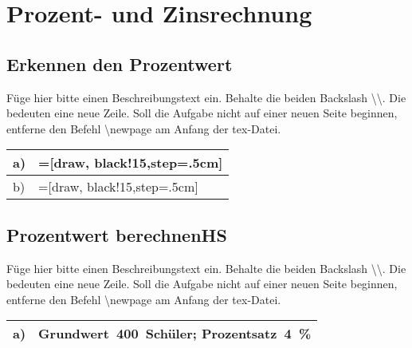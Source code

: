 \newpage
\section{Prozent- und Zinsrechnung}
\subsection{Erkennen den Prozentwert}
Füge hier bitte einen Beschreibungstext ein. Behalte die beiden Backslash \textbackslash\textbackslash. Die bedeuten eine neue Zeile. Soll die Aufgabe nicht auf einer neuen Seite beginnen, entferne den Befehl \textbackslash newpage am Anfang der tex-Datei.\\
\begin{xltabular}{\textwidth}{|C{0.75cm}|X|}
\hline
a)&=[draw, black!15,step=.5cm]
\\\hline
b)&=[draw, black!15,step=.5cm]
\\\hline
\end{xltabular}
\vspace{0.5cm}
\subsection{Prozentwert berechnenHS}
Füge hier bitte einen Beschreibungstext ein. Behalte die beiden Backslash \textbackslash\textbackslash. Die bedeuten eine neue Zeile. Soll die Aufgabe nicht auf einer neuen Seite beginnen, entferne den Befehl \textbackslash newpage am Anfang der tex-Datei.\\
\begin{xltabular}{\textwidth}{|C{0.75cm}|X|}
\hline
a)&Grundwert~400~Schüler;  Prozentsatz~4~\%
\\\hline
\end{xltabular}
\vspace{0.5cm}
